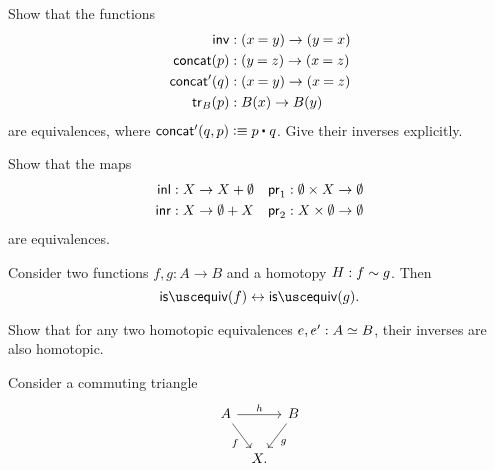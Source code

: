 \begin{exercises}
\item \label{ex:equiv_grpd_ops}Show that the functions
  \begin{align*}
    \invfunc & :(\id{x}{y})\to(\id{y}{x}) \\
    \concat(p) & : (\id{y}{z})\to(\id{x}{z}) \\
    \concat'(q) & : (\id{x}{y}) \to (\id{x}{z}) \\
    \tr_B(p) & :B(x)\to B(y)
  \end{align*}
  are equivalences, where $\concat'(q,p)\defeq \ct{p}{q}$. Give their inverses explicitly.
\item Show that the maps
  \begin{align*}
    {\mathsf{inl}} & : X \to X+\emptyset &     \mathsf{pr}_{1} & : \emptyset \times X \to \emptyset \\
    {\mathsf{inr}} & : X \to \emptyset+X &    \mathsf{pr}_{2} & : X \times \emptyset \to \emptyset
  \end{align*}
  are equivalences.
\item
  \begin{subexenum}
  \item \label{ex:htpy_equiv} Consider two functions $f,g:A\to B$ and a homotopy $H:f\sim g$. Then
    \begin{equation*}
      \isequiv(f)\leftrightarrow\isequiv(g).
    \end{equation*}
  \item Show that for any two homotopic equivalences $e,e':\eqv{A}{B}$, their inverses are also homotopic.
  \end{subexenum}
\item \label{ex:3_for_2}
  Consider a commuting triangle
  \begin{equation*}
    \begin{tikzcd}[column sep=tiny]
      A \arrow[rr,"h"] \arrow[dr,swap,"f"] & & B \arrow[dl,"g"] \\
      & X.

\end{tikzcd}
\end{equation*}
\end{exercises}
